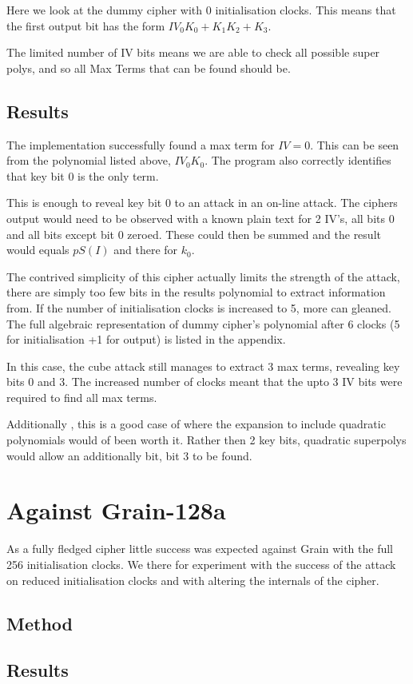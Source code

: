 \documentclass{report}
\let\Oldsection\section
\renewcommand{\section}{\FloatBarrier\Oldsection}
\let\Oldsubsection\subsection
\renewcommand{\subsection}{\FloatBarrier\Oldsubsection}
\begin{document}
Here we look at the dummy cipher with 0 initialisation clocks. This means that the first output bit has the form $IV_0K_0+K_1K_2+K_3$.

The limited number of IV bits means we are able to check all possible super polys, and so all Max Terms that can be found should be.
\subsection{Results}
The implementation successfully found a max term for $IV={0}$. This can be seen from the polynomial listed above, $IV_0K_0$. The program also correctly identifies that key bit 0 is the only term.

This is enough to reveal key bit 0 to an attack in an on-line attack. The ciphers output would need to be observed with a known plain text for 2 IV's, all bits 0 and all bits except bit 0 zeroed. These could then be summed and the result would equals $pS(I)$ and there for $k_0$.

The contrived simplicity of this cipher actually limits the strength of the attack, there are simply too few bits in the results polynomial to extract information from. If the number of initialisation clocks is increased to 5, more can gleaned. The full algebraic representation of dummy cipher's polynomial after 6 clocks (5 for initialisation +1 for output) is listed in the appendix.

In this case, the cube attack still manages to extract 3 max terms, revealing key bits 0 and 3. The increased number of clocks meant that the upto 3 IV bits were required to find all max terms.

Additionally , this is a good case of where the expansion to include quadratic polynomials would of been worth it. Rather then 2 key bits, quadratic superpolys would allow an additionally bit, bit 3 to be found.
\section{Against Grain-128a}
As a fully fledged cipher little success was expected against Grain with the full 256 initialisation clocks. We there for experiment with the success of the attack on reduced initialisation clocks and with altering the internals of the cipher.
\subsection{Method}
\subsection{Results}
\end{document}
